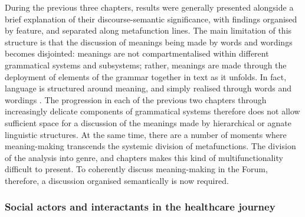 During the previous three chapters,  results were generally presented alongside a brief explanation of their \gls{discourse-semantic} significance, with findings organised by  feature, and separated along metafunction lines. The main limitation of this structure is that the discussion of meanings being made by words and wordings becomes disjointed: meanings are not compartmentalised within different grammatical systems and subsystems; rather, meanings are made through the deployment of elements of the grammar together in text as it unfolds. In fact, language is structured around meaning, and simply realised through words and wordings \cite{halliday1978language}. The progression in each of the previous two chapters through increasingly delicate components of grammatical systems therefore does not allow sufficient space for a discussion of the meanings made by hierarchical or agnate linguistic structures. At the same time, there are a number of moments where meaning\hyp{}making transcends the systemic division of metafunctions. The division of the analysis into genre,  and  chapters makes this kind of multifunctionality difficult to present. To coherently discuss meaning\hyp{}making in the \gls{Forum}, therefore, a discussion organised semantically is now required.

\subsubsection{Social actors and interactants in the healthcare journey}

